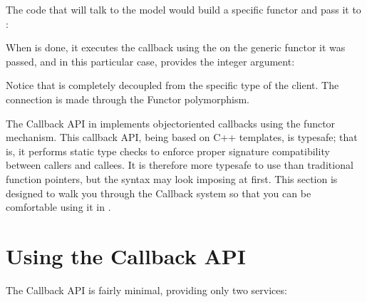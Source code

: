 \documentclass[letterpaper,10pt,english]{sphinxmanual}
\renewcommand{\sphinxcode}[1]{\texttt{\small{#1}}}
\begin{document}
The code that will talk to the model would build a specific functor and pass it to \sphinxcode{}:

\begin{sphinxVerbatim}[commandchars=\\\{\}]
 
    
\end{sphinxVerbatim}

When \sphinxcode{} is done, it executes the callback using the
\sphinxcode{} on the generic functor it was passed, and in this particular
case, provides the integer argument:

\begin{sphinxVerbatim}[commandchars=\\\{\}]
  
\end{sphinxVerbatim}

Notice that \sphinxcode{} is completely decoupled from the specific
type of the client.  The connection is made through the Functor polymorphism.

The Callback API in  implements object\sphinxhyphen{}oriented callbacks using
the functor mechanism.  This callback API, being based on C++ templates, is
type\sphinxhyphen{}safe; that is, it performs static type checks to enforce proper signature
compatibility between callers and callees.  It is therefore more type\sphinxhyphen{}safe to
use than traditional function pointers, but the syntax may look imposing at
first.  This section is designed to walk you through the Callback system so
that you can be comfortable using it in .


\section{Using the Callback API}
\label{\detokenize{callbacks:using-the-callback-api}}
The Callback API is fairly minimal, providing only two services:
\end{document}
